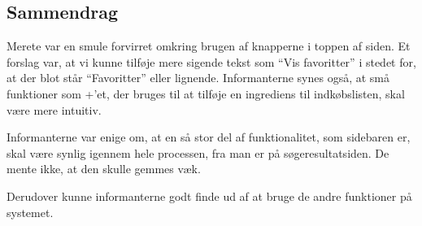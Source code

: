 \subsection{Sammendrag}
Merete var en smule forvirret omkring brugen af knapperne i toppen af siden. Et forslag var, at vi kunne tilføje mere sigende tekst som ``Vis favoritter'' i stedet for, at der blot står ``Favoritter'' eller lignende. Informanterne synes også, at små funktioner som +'et, der bruges til at tilføje en ingrediens til indkøbslisten, skal være mere intuitiv.

Informanterne var enige om, at en så stor del af funktionalitet, som sidebaren er, skal være synlig igennem hele processen, fra man er på søgeresultatsiden. De mente ikke, at den skulle gemmes væk.

Derudover kunne informanterne godt finde ud af at bruge de andre funktioner på systemet.